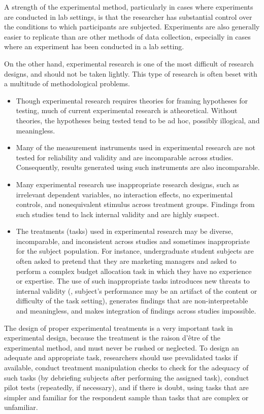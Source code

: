 A strength of the experimental method, particularly in cases where experiments are conducted in lab settings, is that the researcher has substantial control over the conditions to which participants are subjected. Experiments are also generally easier to replicate than are other methods of data collection, especially in cases where an experiment has been conducted in a lab setting.

On the other hand, experimental research is one of the most difficult of research designs, and should not be taken lightly. This type of research is often beset with a multitude of methodological problems. 

\begin{itemize}
	\item Though experimental research requires theories for framing hypotheses for testing, much of current experimental research is atheoretical. Without theories, the hypotheses being tested tend to be ad hoc, possibly illogical, and meaningless. 
	\item Many of the measurement instruments used in experimental research are not tested for reliability and validity and are incomparable across studies. Consequently, results generated using such instruments are also incomparable. 
	\item Many experimental research use inappropriate research designs, such as irrelevant dependent variables, no interaction effects, no experimental controls, and nonequivalent stimulus across treatment groups. Findings from such studies tend to lack internal validity and are highly suspect. 
	\item The treatments (tasks) used in experimental research may be diverse, incomparable, and inconsistent across studies and sometimes inappropriate for the subject population. For instance, undergraduate student subjects are often asked to pretend that they are marketing managers and asked to perform a complex budget allocation task in which they have no experience or expertise. The use of such inappropriate tasks introduces new threats to internal validity (\ie, subject's performance may be an artifact of the content or difficulty of the task setting), generates findings that are non-interpretable and meaningless, and makes integration of findings across studies impossible.
\end{itemize}

The design of proper experimental treatments is a very important task in experimental design, because the treatment is the raison d'\^{e}tre of the experimental method, and must never be rushed or neglected. To design an adequate and appropriate task, researchers should use prevalidated tasks if available, conduct treatment manipulation checks to check for the adequacy of such tasks (by debriefing subjects after performing the assigned task), conduct pilot tests (repeatedly, if necessary), and if there is doubt, using tasks that are simpler and familiar for the respondent sample than tasks that are complex or unfamiliar.

